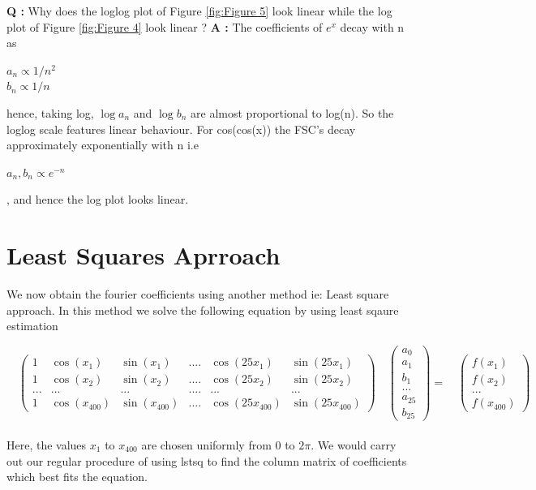 \documentclass{article}
\begin{document}
\noindent\textbf{Q :} Why does the loglog plot of Figure \ref{fig:Figure 5} look linear while the log plot of Figure \ref{fig:Figure 4} look linear ?\newline
\textbf{A :} The coefficients of $e^x$ decay with n as\\ \begin{center}
    $a_n \propto 1/n^2$\\ $b_n \propto 1/n$ 
\end{center} hence, taking log, $\log a_n$ and $\log b_n$ are almost proportional to log(n). So the loglog scale features linear behaviour. For cos(cos(x)) the FSC’s decay approximately exponentially with n i.e \begin{center}
    $a_n , b_n \propto e^{-n}$
\end{center}, and hence the log plot looks linear.

\section{Least Squares Aprroach}

We now obtain the fourier coefficients using another method ie: Least square approach. In this
method we solve the following equation by using least sqaure estimation


\[
\quad
\begin{pmatrix} 
1 & \cos(x_1) & \sin(x_1) & .... & \cos(25x_1) & \sin(25x_1)\\
1 & \cos(x_2) & \sin(x_2) & .... & \cos(25x_2) & \sin(25x_2)\\
... & ... & ... & .... & ... & ... \\
1 & \cos(x_{400}) & \sin(x_{400}) & .... & \cos(25x_{400}) & \sin(25x_{400})
\end{pmatrix}
\quad
\begin{pmatrix} 
a_0\\
a_1\\
b_1\\
...\\
a_{25}\\
b_{25}
\end{pmatrix}
=
\quad
\begin{pmatrix} 
f(x_1)\\
f(x_2)\\
...\\
f(x_{400})
\end{pmatrix}
\]
\\Here, the values $x_1$ to $x_{400}$ are chosen uniformly from 0 to $2\pi$. We would carry out our regular procedure of using lstsq to find the column matrix of coefficients which best fits the equation. 
\end{document}
